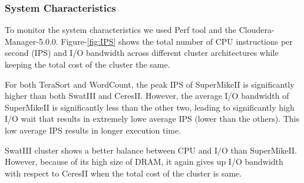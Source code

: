 \documentclass[journal]{IEEEtran}
\begin{document}
\subsubsection{System Characteristics}
To monitor the system characteristics we used Perf tool and the Cloudera-Manager-5.0.0. Figure-\ref{fig:IPS} shows the total number of CPU instructions per second (IPS) and I/O bandwidth across different cluster architectures while keeping the total cost of the cluster the same. 

For both TeraSort and WordCount, the peak IPS of SuperMikeII is significantly higher than both SwatIII and CeresII. However, the average I/O bandwidth of SuperMikeII is significantly less than the other two, leading to significantly high I/O wait that results in extremely lowe average IPS (lower than the others). This low average IPS results in longer execution time. %

SwatIII cluster shows a better balance between CPU and I/O than SuperMikeII. However, because of its high size of DRAM, it again gives up I/O bandwidth with respect to CeresII when the total cost of the cluster is same. 
\end{document}
